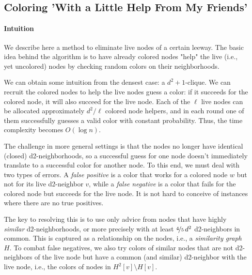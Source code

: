 \documentclass[12pt]{article}
\begin{document}
\subsection{Coloring 'With a Little Help From My Friends'}

\paragraph{Intuition}
We describe here a method to eliminate live nodes of a certain leeway.
The basic idea behind the algorithm is to have already colored nodes "help" the live (i.e., yet uncolored) nodes by checking random colors on their neighborhoods.

We can obtain some intuition from the densest case: a $d^2+1$-clique.
We can recruit the colored nodes to help the live nodes guess a color: if it succeeds for the colored node, it will also succeed for the live node. Each of the $\ell$ live nodes can be allocated approximately $d^2/\ell$ colored node helpers, and in each round one of them successfully guesses a valid color with constant probability. Thus, the time complexity becomes $O(\log n)$.

The challenge in more general settings is that the nodes no longer have identical (closed) d2-neighborhoods, so a successful guess for one node doesn't immediately translate to a successful color for another node.
To this end, we must deal with two types of errors.
A \emph{false positive} is a color that works for a colored node $w$ but not for its live d2-neighbor $v$, while a \emph{false negative} is a color that fails for the colored node but succeeds for the live node.
It is not hard to conceive of instances where there are no true positives.

The key to resolving this is to use only advice from nodes that have highly \emph{similar} d2-neighborhoods, or more precisely with at least $\nicefrac{4}{5}\, d^2$ d2-neighbors in common. This is captured as a relationship on the nodes, i.e., a \emph{similarity graph} $H$.
To combat false negatives, we also try colors of similar nodes that are not d2-neighbors of the live node but have a common (and similar) d2-neighbor with the live node, i.e., the colors of nodes in $H^2[v] \setminus H[v]$.
\end{document}
